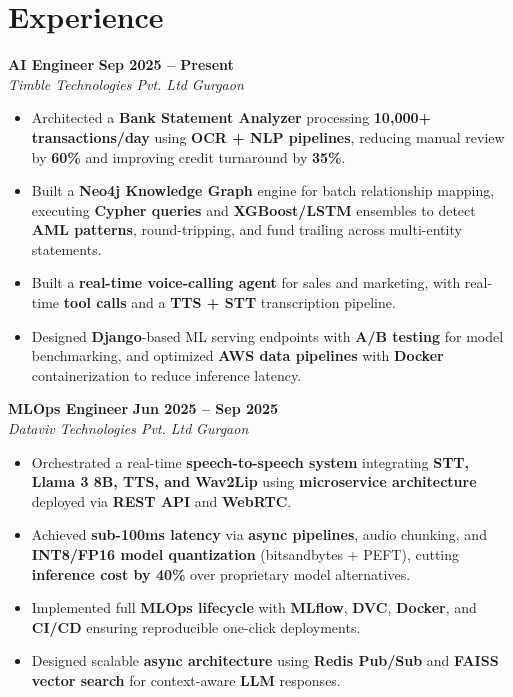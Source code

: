 \documentclass[letterpaper,9pt]{extarticle}
\newcommand{\role}[4]{\textbf{#1} \hfill \textbf{#2}\\[-1pt]\textit{#3} \hfill \textit{#4}\vspace{1pt}}
\begin{document}
\section{Experience}
\role{AI Engineer}{Sep 2025 -- Present}{Timble Technologies Pvt. Ltd}{Gurgaon}
\begin{itemize}
  \item Architected a \textbf{Bank Statement Analyzer} processing \textbf{10,000+ transactions/day} using \textbf{OCR + NLP pipelines}, reducing manual review by \textbf{60\%} and improving credit turnaround by \textbf{35\%}.
  \item Built a \textbf{Neo4j Knowledge Graph} engine for batch relationship mapping, executing \textbf{Cypher queries} and \textbf{XGBoost/LSTM} ensembles to detect \textbf{AML patterns}, round-tripping, and fund trailing across multi-entity statements.
  \item Built a \textbf{real-time voice-calling agent} for sales and marketing, with real-time \textbf{tool calls} and a \textbf{TTS + STT} transcription pipeline.
  \item Designed \textbf{Django}-based ML serving endpoints with \textbf{A/B testing} for model benchmarking, and optimized \textbf{AWS data pipelines} with \textbf{Docker} containerization to reduce inference latency.
\end{itemize}

\role{MLOps Engineer}{Jun 2025 -- Sep 2025}{Dataviv Technologies Pvt. Ltd}{Gurgaon}
\begin{itemize}
  \item Orchestrated a real-time \textbf{speech-to-speech system} integrating \textbf{STT, Llama 3 8B, TTS, and Wav2Lip} using \textbf{microservice architecture} deployed via \textbf{REST API} and \textbf{WebRTC}.
  \item Achieved \textbf{sub-100ms latency} via \textbf{async pipelines}, audio chunking, and \textbf{INT8/FP16 model quantization} (bitsandbytes + PEFT), cutting \textbf{inference cost by 40\%} over proprietary model alternatives.
  \item Implemented full \textbf{MLOps lifecycle} with \textbf{MLflow}, \textbf{DVC}, \textbf{Docker}, and \textbf{CI/CD} ensuring reproducible one-click deployments.
  \item Designed scalable \textbf{async architecture} using \textbf{Redis Pub/Sub} and \textbf{FAISS vector search} for context-aware \textbf{LLM} responses.
\end{itemize}
\end{document}
